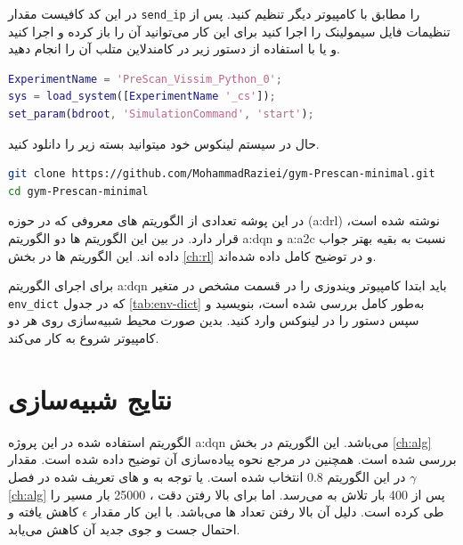 در این کد کافیست مقدار \texttt{send\_ip} را مطابق با  کامپیوتر دیگر تنظیم کنید. پس از تنظیمات فایل سیمولینک را اجرا کنید برای این کار می‌توانید آن را باز کرده و اجرا کنید و یا با استفاده از دستور زیر در کامندلاین متلب آن را انجام دهید.
\begin{latin}
\begin{lstlisting}[language=matlab]
ExperimentName = 'PreScan_Vissim_Python_0';
sys = load_system([ExperimentName '_cs']);
set_param(bdroot, 'SimulationCommand', 'start');
\end{lstlisting}
\end{latin}

حال در سیستم لینکوس خود میتوانید بسته زیر را دانلود کنید.

\begin{latin}
\begin{lstlisting}[language=bash]
git clone https://github.com/MohammadRaziei/gym-Prescan-minimal.git
cd gym-Prescan-minimal
\end{lstlisting}
\end{latin}

در این پوشه تعدادی از الگوریتم های معروفی که در حوزه (\gls{a:drl}) نوشته شده است، قرار دارد.
در بین این الگوریتم ها دو الگوریتم \gls{a:dqn} و \gls{a:a2c} نسبت به بقیه بهتر جواب داده اند. این الگوریتم ها در بخش 
\ref{ch:rl}
و در 
\cite{stable-baselines}
توضیح کامل داده شده‌اند.

برای اجرای الگوریتم \gls{a:dqn} باید ابتدا  کامپیوتر ویندوزی را در قسمت مشخص در متغیر \texttt{env\_dict} که در جدول \ref{tab:env-dict} به‌طور کامل بررسی شده است، بنویسید و سپس دستور  را در  لینوکس وارد کنید. بدین صورت محیط شبیه‌سازی روی هر دو کامپیوتر شروع به کار می‌کند.



\section{نتایج شبیه‌سازی}

الگوریتم استفاده شده در این پروژه \gls{a:dqn} می‌باشد. این الگوریتم در بخش \ref{ch:alg}  بررسی شده است. همچنین در مرجع \cite{stable-baselines-doc} نحوه پیاده‌سازی آن توضیح داده شده است. مقدار $\gamma$ در این الگوریتم $0.8$ انتخاب شده است. یا توجه به  و   های تعریف شده در فصل \ref{ch:alg} پس از 400 بار تلاش به  می‌رسد.
اما برای بالا رفتن دقت ، 25000 بار  مسیر را طی کرده است. دلیل آن بالا رفتن تعداد ها می‌باشد. با این کار مقدار $\epsilon$ کاهش یافته و احتمال جست و جوی  جدید آن کاهش می‌یابد.


